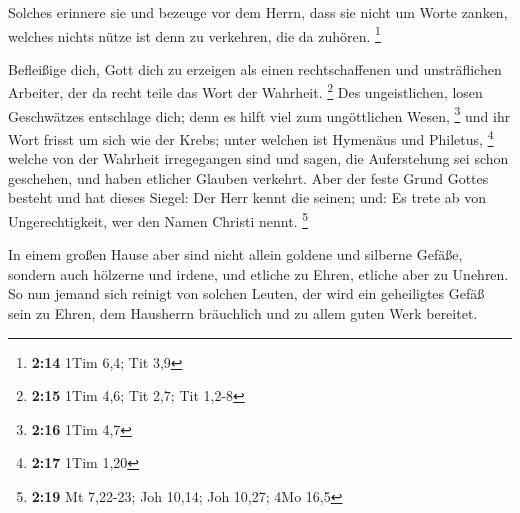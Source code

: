  Solches erinnere sie und bezeuge vor dem Herrn, dass sie
nicht um Worte zanken, welches nichts nütze ist denn zu verkehren, die
da zuhören. \footnote{\textbf{2:14} 1Tim 6,4; Tit 3,9}

 Befleißige dich, Gott dich zu erzeigen als einen
rechtschaffenen und unsträflichen Arbeiter, der da recht teile das Wort
der Wahrheit. \footnote{\textbf{2:15} 1Tim 4,6; Tit 2,7; Tit 1,2-8}
 Des ungeistlichen, losen Geschwätzes entschlage dich;
denn es hilft viel zum ungöttlichen Wesen, \footnote{\textbf{2:16} 1Tim
  4,7}  und ihr Wort frisst um sich wie der Krebs; unter
welchen ist Hymenäus und Philetus, \footnote{\textbf{2:17} 1Tim 1,20}
 welche von der Wahrheit irregegangen sind und sagen, die
Auferstehung sei schon geschehen, und haben etlicher Glauben verkehrt.
 Aber der feste Grund Gottes besteht und hat dieses
Siegel: Der Herr kennt die seinen; und: Es trete ab von Ungerechtigkeit,
wer den Namen Christi nennt. \footnote{\textbf{2:19} Mt 7,22-23; Joh
  10,14; Joh 10,27; 4Mo 16,5}

 In einem großen Hause aber sind nicht allein goldene und
silberne Gefäße, sondern auch hölzerne und irdene, und etliche zu Ehren,
etliche aber zu Unehren.  So nun jemand sich reinigt von
solchen Leuten, der wird ein geheiligtes Gefäß sein zu Ehren, dem
Hausherrn bräuchlich und zu allem guten Werk bereitet.

